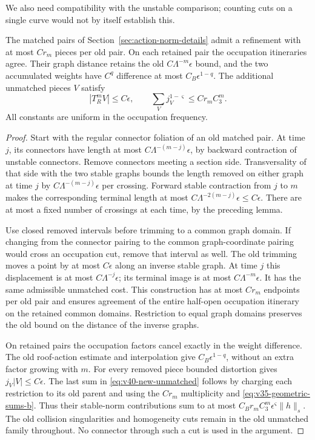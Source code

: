 We also need compatibility with the unstable comparison; counting
cuts on a single curve would not by itself establish this.

\begin{lemma}
\label{lem:v40-occupation-matching}
The matched pairs of Section~\ref{sec:action-norm-details} admit a
refinement with at most $Cr_m$ pieces per old pair. On each retained
pair the occupation itineraries agree. Their graph distance retains
the old $C\Lambda^{-m}\epsilon$ bound, and the two accumulated weights
have $C^q$ difference at most $C_B\epsilon^{1-q}$.
The additional unmatched pieces $V$ satisfy
\begin{equation}\label{eq:v40-new-unmatched}
 |T_R^mV|\le C\epsilon,\qquad
 \sum_V j_V^{1-\varsigma}\le Cr_m C_3^m.
\end{equation}
All constants are uniform in the occupation frequency.
\end{lemma}
\begin{proof}
Start with the regular connector foliation of an old matched pair.
At time $j$, its connectors have length at most
$C\Lambda^{-(m-j)}\epsilon$, by backward contraction of unstable
connectors. Remove connectors meeting a section side. Transversality
of that side with the two stable graphs bounds the length removed on
either graph at time $j$ by $C\Lambda^{-(m-j)}\epsilon$ per crossing.
Forward stable contraction from $j$ to $m$ makes the corresponding
terminal length at most $C\Lambda^{-2(m-j)}\epsilon\le C\epsilon$.
There are at most a fixed number of crossings at each time, by the
preceding lemma.

Use closed removed intervals before trimming to a common graph domain.
If changing from the connector pairing to the common graph-coordinate
pairing would cross an occupation cut, remove that interval as well.
The old trimming moves a point by at most $C\epsilon$ along an inverse
stable graph. At time $j$ this displacement is at most
$C\Lambda^{-j}\epsilon$; its terminal image is at most
$C\Lambda^{-m}\epsilon$. It has the same admissible unmatched cost.
This construction has at most $Cr_m$ endpoints per old pair and
ensures agreement of the entire half-open occupation itinerary on
the retained common domains. Restriction to equal graph domains
preserves the old bound on the distance of the inverse graphs.

On retained pairs the occupation factors cancel exactly in the weight
difference. The old roof-action estimate and interpolation give
$C_B\epsilon^{1-q}$, without an extra factor growing with $m$.
For every removed piece bounded distortion gives
$j_V|V|\le C\epsilon$. The last sum in
\eqref{eq:v40-new-unmatched} follows by charging each restriction to
its old parent and using the $Cr_m$ multiplicity and
\eqref{eq:v35-geometric-sums-b}. Thus their stable-norm contributions
sum to at most
$C_B r_m C_3^m\epsilon^\varsigma\|h\|_s$.
The old collision singularities and homogeneity cuts remain in the
old unmatched family throughout. No connector through such a cut is
used in the argument.
\end{proof}

